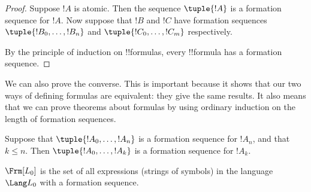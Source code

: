 \documentclass[../../../include/open-logic-section]{subfiles}
\begin{document}
\begin{proof}
Suppose $!A$ is atomic. Then the sequence $\tuple{!A}$ is a
formation sequence for $!A$.
%
Now suppose that $!B$ and $!C$ have formation sequences
$\tuple{!B_0,\dotsc,!B_n}$ and $\tuple{!C_0,\dotsc,!C_m}$
respectively.
%
\begin{enumerate}
\end{enumerate}
By the principle of induction on !!{formula}s,
every !!{formula} has a formation sequence.
\end{proof}

We can also prove the converse. This is important because it shows
that our two ways of defining formulas are equivalent: they give
the same results. It also means that we can prove theorems about
formulas by using ordinary induction on the length of formation
sequences.

\begin{lem}
Suppose that $\tuple{!A_0,\dotsc,!A_n}$ is a formation sequence
for $!A_n$, and that $k \leq n$. Then $\tuple{!A_0,\dotsc,!A_k}$
is a formation sequence for $!A_k$.
\end{lem}

\begin{thm}
$\Frm[L_0]$ is the set of all expressions (strings of symbols)
in the language $\Lang L_0$ with a formation sequence.
\end{thm}
\end{document}
